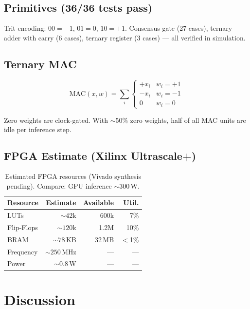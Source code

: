 \documentclass[10pt,twocolumn]{article}
\begin{document}
\subsection{Primitives (36/36 tests pass)}

Trit encoding: $00=-1$, $01=0$, $10=+1$.
Consensus gate (27 cases), ternary adder with carry (6 cases),
ternary register (3 cases) --- all verified in simulation.

\subsection{Ternary MAC}

\begin{equation*}
\text{MAC}(x,w) = \sum_i
\begin{cases} +x_i & w_i=+1 \\ -x_i & w_i=-1 \\ 0 & w_i=0 \end{cases}
\end{equation*}

Zero weights are clock-gated. With ${\sim}50\%$ zero weights,
half of all MAC units are idle per inference step.

\subsection{FPGA Estimate (Xilinx Ultrascale+)}

\begin{table}[H]
\centering\small
\begin{tabular}{lrrr}
\toprule
Resource   & Estimate & Available & Util. \\ \midrule
LUTs       & ${\sim}42$k  & 600k  & 7\%   \\
Flip-Flops & ${\sim}120$k & 1.2M  & 10\%  \\
BRAM       & ${\sim}78$\,KB & 32\,MB & $<$1\% \\
Frequency  & ${\sim}250$\,MHz & --- & ---  \\
Power      & ${\sim}0.8$\,W  & --- & ---  \\
\bottomrule
\end{tabular}
\caption{Estimated FPGA resources (Vivado synthesis pending).
Compare: GPU inference ${\sim}$300\,W.}
\end{table}

\section{Discussion}
\end{document}
